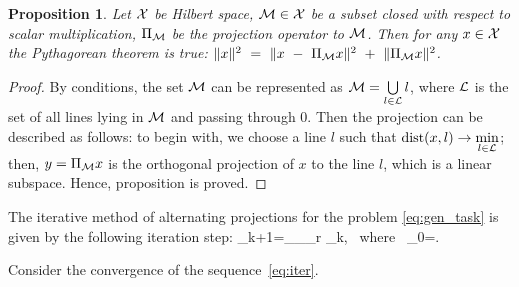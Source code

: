 \documentclass[sii]{ipart}
\newtheorem{proposition}{Proposition}
\begin{document}
\begin{proposition} \label{pythaprop}
	Let $\mathcal{X}$ be Hilbert space, $\mathcal{M}\in \mathcal{X}$ be a subset closed with respect to scalar multiplication, $\Pi_{\mathcal{M}}$ be the projection operator to $\mathcal{M}$. Then for any $x \in \mathcal{X}$ the Pythagorean theorem is true: $\|x\|^2~=~\|x~-~\Pi_{\mathcal{M}} x\|^2~+~\|\Pi_{\mathcal{M}} x\|^2$.
\end{proposition}
\begin{proof}
	By conditions, the set $\mathcal{M}$ can be represented as $\mathcal{M} = \bigcup\limits_{l \in \mathcal{L}}l$, where $\mathcal{L}$ is the set of all lines lying in $\mathcal{M}$ and passing through $0$. Then the projection can be described as follows: to begin with, we choose a line $l$ such that $\mathop{\mathrm{dist}}(x, l) \rightarrow \min\limits_{l \in \mathcal{L}}$; then, $y = \Pi_{\mathcal{M}} x$ is the orthogonal projection of $x$ to the line $l$, which is a linear subspace. Hence, proposition is proved.
\end{proof}

The iterative method of alternating projections for the problem \eqref{eq:gen_task} is given by the following iteration step:
\be
\label{eq:iter}
\bfY_{k+1}=\Pi_\calH \Pi_{\calM_r} \bfY_{k}, \mbox{\ where\ } \bfY_{0}=\bfX.
\ee

Consider the convergence of the sequence~\eqref{eq:iter}.
\end{document}
